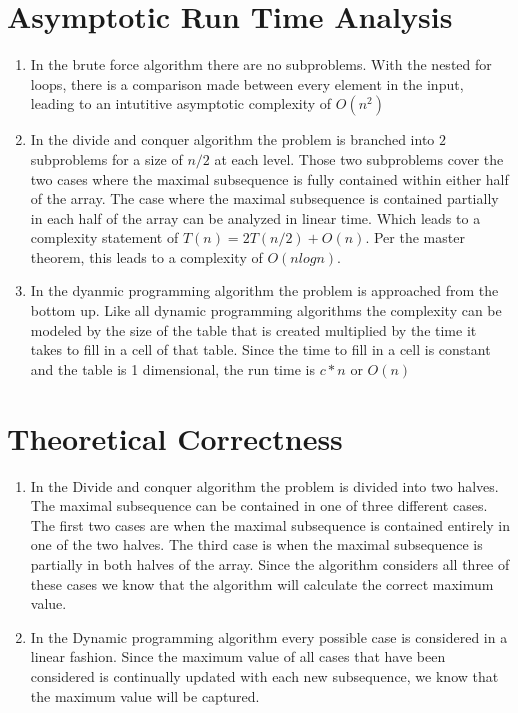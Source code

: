 \documentclass[12pt]{article}
\begin{document}
\section{Asymptotic Run Time Analysis}
    \begin{enumerate}

    \item In the brute force algorithm there are no subproblems.  With the
            nested for loops, there is a comparison made between every element
            in the input, leading to an intutitive asymptotic complexity of 
            $O(n^2)$

	\item In the divide and conquer algorithm the problem is branched into 
            $2$ subproblems for a size of $n/2$ at each level.  Those two
            subproblems cover the two cases where the maximal subsequence
            is fully contained within either half of the array.  The case
            where the maximal subsequence is contained partially in each
            half of the array can be analyzed in linear time.  Which leads
            to a complexity statement of $T(n) = 2T(n/2) + O(n)$.  Per the
            master theorem, this leads to a complexity of $O(n log n)$.

    \item In the dyanmic programming algorithm the problem is approached 
            from the bottom up. Like all dynamic programming algorithms
            the complexity can be modeled by the size of the table that is
            created multiplied by the time it takes to fill in a cell of that
            table.  Since the time to fill in a cell is constant and the table
            is 1 dimensional, the run time is $c*n$ or $O(n)$   
     \end{enumerate}

\section{Theoretical Correctness}
    \begin{enumerate}

    \item In the Divide and conquer algorithm the problem is divided into two
            halves.  The maximal subsequence can be contained in one of three
            different cases.  The first two cases are when the maximal
            subsequence is contained entirely in one of the two halves. The 
            third case is when the maximal subsequence is partially in both
            halves of the array.  Since the algorithm considers all three of
            these cases we know that the algorithm will calculate the correct
            maximum value.

    \item In the Dynamic programming algorithm every possible case is 
            considered in a linear fashion.  Since the maximum value of all
            cases that have been considered is continually updated with each
            new subsequence, we know that the maximum value will be captured.

    \end{enumerate}
\end{document}
